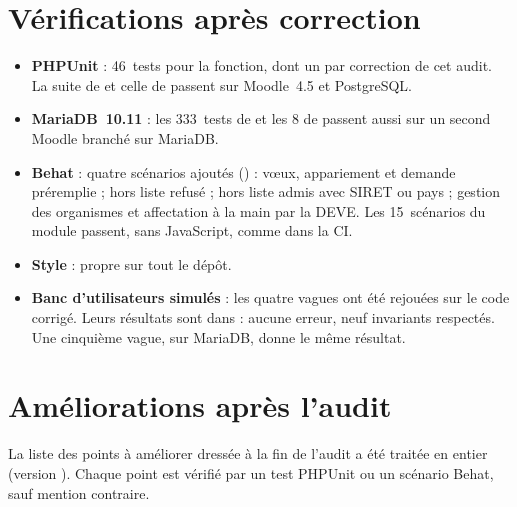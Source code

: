 \documentclass[11pt,a4paper]{article}
\begin{document}
\section{Vérifications après correction}\label{sec:verifications}

\begin{itemize}
  \item \textbf{PHPUnit} : 46~tests pour la fonction, dont un par correction de cet audit. La suite
    de  et celle de  passent sur Moodle~4.5 et PostgreSQL.
  \item \textbf{MariaDB~10.11} : les 333~tests de  et les 8 de
     passent aussi sur un second Moodle branché sur MariaDB.
  \item \textbf{Behat} : quatre scénarios ajoutés () : vœux,
    appariement et demande préremplie ; hors liste refusé ; hors liste admis avec SIRET ou pays ;
    gestion des organismes et affectation à la main par la DEVE. Les 15~scénarios du module
    passent, sans JavaScript, comme dans la CI.
  \item \textbf{Style} :  propre sur tout le dépôt.
  \item \textbf{Banc d'utilisateurs simulés} : les quatre vagues ont été rejouées sur le code
    corrigé. Leurs résultats sont dans  : aucune erreur, neuf
    invariants respectés. Une cinquième vague, sur MariaDB, donne le même résultat.
\end{itemize}

\section{Améliorations après l'audit}\label{sec:ameliorations}

La liste des points à améliorer dressée à la fin de l'audit a été traitée en entier (version
). Chaque point est vérifié par un test PHPUnit ou un scénario Behat, sauf mention
contraire.
\end{document}
